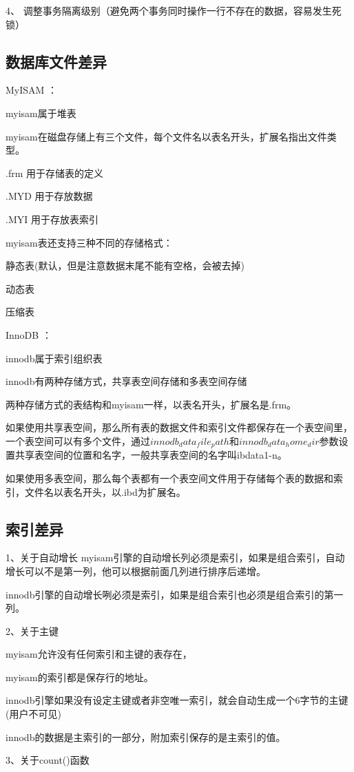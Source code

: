 \documentclass[UTF8]{ctexart}
\begin{document}
4、  调整事务隔离级别（避免两个事务同时操作一行不存在的数据，容易发生死锁）

 
\subsection{数据库文件差异}

MyISAM ：

myisam属于堆表

myisam在磁盘存储上有三个文件，每个文件名以表名开头，扩展名指出文件类型。

.frm 用于存储表的定义

.MYD 用于存放数据

.MYI 用于存放表索引

myisam表还支持三种不同的存储格式：

静态表(默认，但是注意数据末尾不能有空格，会被去掉)

动态表

压缩表

InnoDB ：

innodb属于索引组织表

innodb有两种存储方式，共享表空间存储和多表空间存储

两种存储方式的表结构和myisam一样，以表名开头，扩展名是.frm。

如果使用共享表空间，那么所有表的数据文件和索引文件都保存在一个表空间里，一个表空间可以有多个文件，通过$innodb_data_file_path$和$innodb_data_home_dir$参数设置共享表空间的位置和名字，一般共享表空间的名字叫ibdata1-n。

如果使用多表空间，那么每个表都有一个表空间文件用于存储每个表的数据和索引，文件名以表名开头，以.ibd为扩展名。
\subsection{索引差异}
1、关于自动增长
myisam引擎的自动增长列必须是索引，如果是组合索引，自动增长可以不是第一列，他可以根据前面几列进行排序后递增。

innodb引擎的自动增长咧必须是索引，如果是组合索引也必须是组合索引的第一列。

2、关于主键

myisam允许没有任何索引和主键的表存在，

myisam的索引都是保存行的地址。

innodb引擎如果没有设定主键或者非空唯一索引，就会自动生成一个6字节的主键(用户不可见)

innodb的数据是主索引的一部分，附加索引保存的是主索引的值。

3、关于count()函数
\end{document}
